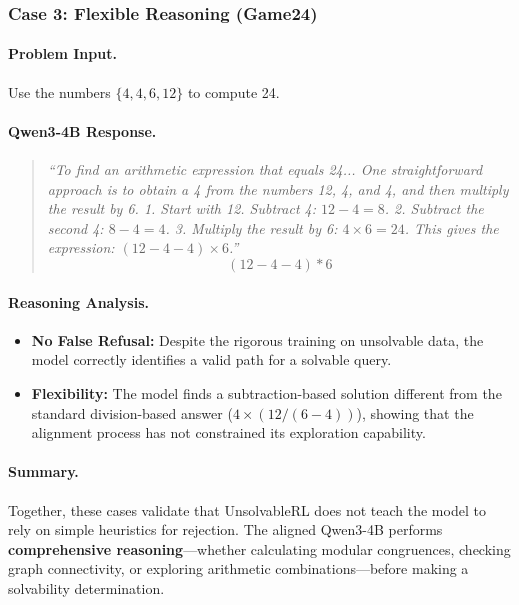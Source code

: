 \subsubsection*{Case 3: Flexible Reasoning (Game24)}

\paragraph{Problem Input.} 
Use the numbers $\{4, 4, 6, 12\}$ to compute 24.

\paragraph{Qwen3-4B Response.}
\begin{quote}
\small
\textit{``To find an arithmetic expression that equals 24... One straightforward approach is to obtain a 4 from the numbers 12, 4, and 4, and then multiply the result by 6.
1. Start with 12. Subtract 4: $12 - 4 = 8$.
2. Subtract the second 4: $8 - 4 = 4$.
3. Multiply the result by 6: $4 \times 6 = 24$.
This gives the expression: $(12 - 4 - 4) \times 6$.''}
\[ (12 - 4 - 4) * 6 \]
\end{quote}

\paragraph{Reasoning Analysis.}
\begin{itemize}
    \item \textbf{No False Refusal:} Despite the rigorous training on unsolvable data, the model correctly identifies a valid path for a solvable query.
    \item \textbf{Flexibility:} The model finds a subtraction-based solution different from the standard division-based answer ($4 \times (12 / (6 - 4))$), showing that the alignment process has not constrained its exploration capability.
\end{itemize}

\paragraph{Summary.}
Together, these cases validate that UnsolvableRL does not teach the model to rely on simple heuristics for rejection. The aligned Qwen3-4B performs \textbf{comprehensive reasoning}—whether calculating modular congruences, checking graph connectivity, or exploring arithmetic combinations—before making a solvability determination.

